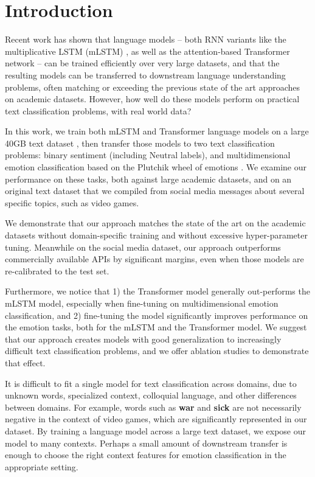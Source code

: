 \documentclass[letterpaper]{article} %
\begin{document}
\section{Introduction}
Recent work has shown that language models -- both RNN variants like the multiplicative LSTM (mLSTM) \protect\cite{Krause2016}, as well as the attention-based Transformer network \protect\cite{Transformer2017} -- can be trained efficiently over very large datasets, and that the resulting models can be transferred to downstream language understanding problems, often matching or exceeding the previous state of the art approaches on academic datasets. However, how well do these models perform on practical text classification problems, with real world data?

In this work, we train both mLSTM and Transformer language models on a large 40GB text dataset \protect\cite{McAuley2015}, then transfer those models to two text classification problems: binary sentiment (including Neutral labels), and multidimensional emotion classification based on the Plutchik wheel of emotions \protect\cite{Plutchik1979}. We examine our performance on these tasks, both against large academic datasets, and on an original text dataset that we compiled from social media messages about several specific topics, such as video games. 

We demonstrate that our approach matches the state of the art on the academic datasets without domain-specific training and without excessive hyper-parameter tuning. Meanwhile on the social media dataset, our approach outperforms commercially available APIs by significant margins, even when those models are re-calibrated to the test set. 

Furthermore, we notice that 1) the Transformer model generally out-performs the mLSTM model, especially when fine-tuning on multidimensional emotion classification, and 2) fine-tuning the model significantly improves performance on the emotion tasks, both for the mLSTM and the Transformer model. We suggest that our approach creates models with good generalization to increasingly difficult text classification problems, and we offer ablation studies to demonstrate that effect. 

It is difficult to fit a single model for text classification across domains, due to unknown words, specialized context, colloquial language, and other differences between domains. For example, words such as \textbf{war} and \textbf{sick} are not necessarily negative in the context of video games, which are significantly represented in our dataset. By training a language model across a large text dataset, we expose our model to many contexts. Perhaps a small amount of downstream transfer is enough to choose the right context features for emotion classification in the appropriate setting. 
\end{document}
